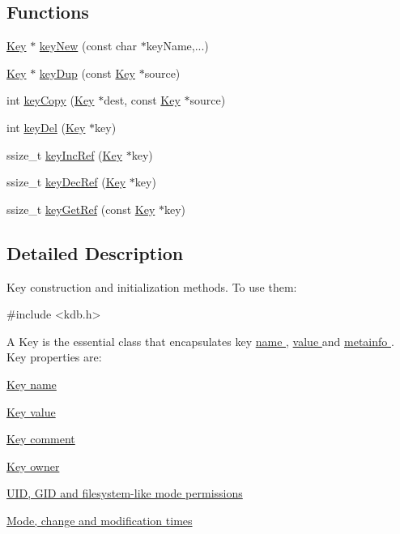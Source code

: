 \subsection*{Functions}
\begin{DoxyCompactItemize}
\item 
\hyperlink{struct__Key}{Key} $\ast$ \hyperlink{group__key_gaf6893c038b3ebee90c73a9ea8356bebf}{keyNew} (const char $\ast$keyName,...)
\item 
\hyperlink{struct__Key}{Key} $\ast$ \hyperlink{group__key_gae6ec6a60cc4b8c1463fa08623d056ce3}{keyDup} (const \hyperlink{struct__Key}{Key} $\ast$source)
\item 
int \hyperlink{group__key_ga6a12cbbe656a1ad9f41b8c681d7a2f92}{keyCopy} (\hyperlink{struct__Key}{Key} $\ast$dest, const \hyperlink{struct__Key}{Key} $\ast$source)
\item 
int \hyperlink{group__key_ga3df95bbc2494e3e6703ece5639be5bb1}{keyDel} (\hyperlink{struct__Key}{Key} $\ast$key)
\item 
ssize\_\-t \hyperlink{group__key_ga6970a6f254d67af7e39f8e469bb162f1}{keyIncRef} (\hyperlink{struct__Key}{Key} $\ast$key)
\item 
ssize\_\-t \hyperlink{group__key_ga2c6433ca22109e4e141946057eccb283}{keyDecRef} (\hyperlink{struct__Key}{Key} $\ast$key)
\item 
ssize\_\-t \hyperlink{group__key_ga4aabc4272506dd63161db2bbb42de8ae}{keyGetRef} (const \hyperlink{struct__Key}{Key} $\ast$key)
\end{DoxyCompactItemize}


\subsection{Detailed Description}
Key construction and initialization methods. To use them: 
\begin{DoxyCode}
#include <kdb.h>
\end{DoxyCode}


A Key is the essential class that encapsulates key \hyperlink{group__keyname}{name }, \hyperlink{group__keyvalue}{value } and \hyperlink{group__keymeta}{metainfo }. Key properties are:
\begin{DoxyItemize}
\item \hyperlink{group__keyname}{Key name }
\item \hyperlink{group__keyvalue}{Key value }
\item \hyperlink{group__keyvalue_gafb89735689929ff717cc9f2d0d0b46a2}{Key comment }
\item \hyperlink{group__keyname_ga35922a017bee8b4bcb493bbdfad9d6f5}{Key owner }
\item \hyperlink{group__keymeta}{UID, GID and filesystem-\/like mode permissions }
\item \hyperlink{group__keymeta}{Mode, change and modification times }
\end{DoxyItemize}

